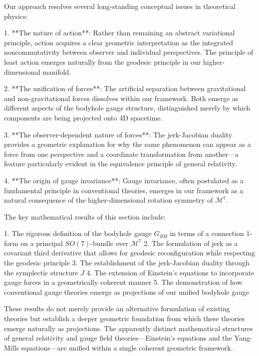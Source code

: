 \documentclass{article}
\begin{document}
Our approach resolves several long-standing conceptual issues in theoretical physics:

1. **The nature of action**: Rather than remaining an abstract variational principle, action acquires a clear geometric interpretation as the integrated noncommutativity between observer and individual perspectives. The principle of least action emerges naturally from the geodesic principle in our higher-dimensional manifold.

2. **The unification of forces**: The artificial separation between gravitational and non-gravitational forces dissolves within our framework. Both emerge as different aspects of the bodyhole gauge structure, distinguished merely by which components are being projected onto 4D spacetime.

3. **The observer-dependent nature of forces**: The jerk-Jacobian duality provides a geometric explanation for why the same phenomenon can appear as a force from one perspective and a coordinate transformation from another—a feature particularly evident in the equivalence principle of general relativity.

4. **The origin of gauge invariance**: Gauge invariance, often postulated as a fundamental principle in conventional theories, emerges in our framework as a natural consequence of the higher-dimensional rotation symmetry of $\mathcal{M}^7$.

The key mathematical results of this section include:

1. The rigorous definition of the bodyhole gauge $G_{BH}$ in terms of a connection 1-form on a principal $SO(7)$-bundle over $\mathcal{M}^7$
2. The formulation of jerk as a covariant third derivative that allows for geodesic reconfiguration while respecting the geodesic principle
3. The establishment of the jerk-Jacobian duality through the symplectic structure $J$
4. The extension of Einstein's equations to incorporate gauge forces in a geometrically coherent manner
5. The demonstration of how conventional gauge theories emerge as projections of our unified bodyhole gauge

These results do not merely provide an alternative formulation of existing theories but establish a deeper geometric foundation from which these theories emerge naturally as projections. The apparently distinct mathematical structures of general relativity and gauge field theories—Einstein's equations and the Yang-Mills equations—are unified within a single coherent geometric framework.
\end{document}
